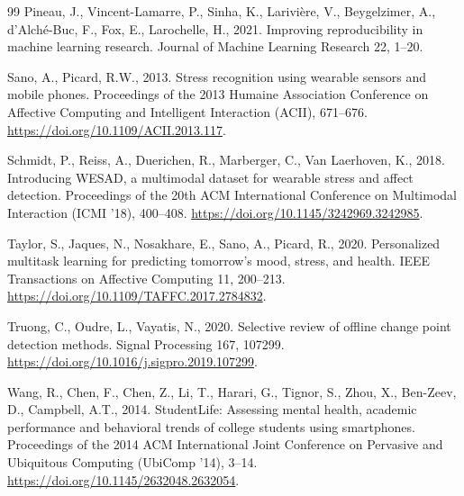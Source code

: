 \documentclass[preprint,12pt,authoryear]{elsarticle}
\begin{document}
\begin{thebibliography}{99}
Pineau, J., Vincent-Lamarre, P., Sinha, K., Larivi\`{e}re, V.,
Beygelzimer, A., d'Alch\'{e}-Buc, F., Fox, E., Larochelle, H., 2021.
Improving reproducibility in machine learning research.
Journal of Machine Learning Research 22, 1--20.

Sano, A., Picard, R.W., 2013.
Stress recognition using wearable sensors and mobile phones.
Proceedings of the 2013 Humaine Association Conference on Affective
Computing and Intelligent Interaction (ACII), 671--676.
\url{https://doi.org/10.1109/ACII.2013.117}.

Schmidt, P., Reiss, A., Duerichen, R., Marberger, C.,
Van Laerhoven, K., 2018.
Introducing WESAD, a multimodal dataset for wearable stress and affect
detection.
Proceedings of the 20th ACM International Conference on Multimodal
Interaction (ICMI '18), 400--408.
\url{https://doi.org/10.1145/3242969.3242985}.

Taylor, S., Jaques, N., Nosakhare, E., Sano, A., Picard, R., 2020.
Personalized multitask learning for predicting tomorrow's mood, stress,
and health.
IEEE Transactions on Affective Computing 11, 200--213.
\url{https://doi.org/10.1109/TAFFC.2017.2784832}.

Truong, C., Oudre, L., Vayatis, N., 2020.
Selective review of offline change point detection methods.
Signal Processing 167, 107299.
\url{https://doi.org/10.1016/j.sigpro.2019.107299}.

Wang, R., Chen, F., Chen, Z., Li, T., Harari, G., Tignor, S., Zhou,
X., Ben-Zeev, D., Campbell, A.T., 2014.
StudentLife: Assessing mental health, academic performance and behavioral
trends of college students using smartphones.
Proceedings of the 2014 ACM International Joint Conference on Pervasive
and Ubiquitous Computing (UbiComp '14), 3--14.
\url{https://doi.org/10.1145/2632048.2632054}.

\end{thebibliography}
\end{document}
